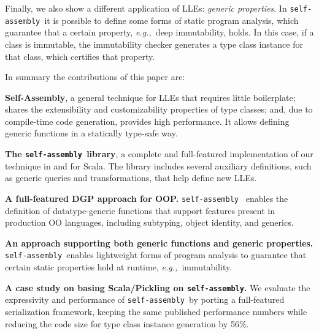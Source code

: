 \documentclass[preprint,nocopyrightspace]{sigplanconf}
\newcommand{\eg}{{\em e.g.,~}}
\newcommand{\selfassembly}{\texttt{self-assembly~}}
\newcommand{\sselfassembly}{\texttt{self-assembly}}
\begin{document}
Finally, we also show a different application of LLEs: \emph{generic
properties}. In \selfassembly it is possible to define some forms of static
program analysis, which guarantee that a certain property, \eg deep
immutability, holds. In this case, if a class is immutable, the immutability
checker generates a type class instance for that class, which certifies that
property.

In summary the contributions of this paper are:

\begin{itemize*}

\item {\bf Self-Assembly}, a general technique for LLEs that requires
  little boilerplate; shares the extensibility and customizability
  properties of type classes; and, due to compile-time
  code generation, provides high performance. It allows defining
  generic functions in a statically type-safe way.

\item {\bf The \selfassembly library}, a complete and full-featured
  implementation of our technique in and for Scala.
  The library includes several auxiliary definitions, such as
  generic queries and transformations, that help define new LLEs.

\item {\bf A full-featured DGP approach for OOP.} \selfassembly
  enables the definition of datatype-generic functions that
  support features present in production OO languages, including
  subtyping, object identity, and generics.

\item {\bf An approach supporting both generic functions and generic
  properties.} \selfassembly enables lightweight forms of program
  analysis to guarantee that certain static properties hold at
  runtime, \eg immutability.

\item {\bf A case study on basing Scala/Pickling on \sselfassembly.}
  We evaluate the expressivity and performance of \selfassembly by
  porting a full-featured serialization framework, keeping the same
  published performance numbers while reducing the code size for
  type class instance generation by 56\%.




\end{itemize*}
\end{document}
